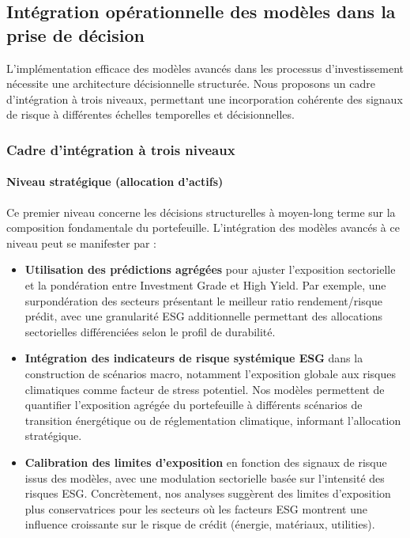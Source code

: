 \subsection{Intégration opérationnelle des modèles dans la prise de décision}

L'implémentation efficace des modèles avancés dans les processus d'investissement nécessite une architecture décisionnelle structurée. Nous proposons un cadre d'intégration à trois niveaux, permettant une incorporation cohérente des signaux de risque à différentes échelles temporelles et décisionnelles.

\subsubsection{Cadre d'intégration à trois niveaux}

\paragraph{Niveau stratégique (allocation d'actifs)}

Ce premier niveau concerne les décisions structurelles à moyen-long terme sur la composition fondamentale du portefeuille. L'intégration des modèles avancés à ce niveau peut se manifester par :

\begin{itemize}
    \item \textbf{Utilisation des prédictions agrégées} pour ajuster l'exposition sectorielle et la pondération entre Investment Grade et High Yield. Par exemple, une surpondération des secteurs présentant le meilleur ratio rendement/risque prédit, avec une granularité ESG additionnelle permettant des allocations sectorielles différenciées selon le profil de durabilité.
    
    \item \textbf{Intégration des indicateurs de risque systémique ESG} dans la construction de scénarios macro, notamment l'exposition globale aux risques climatiques comme facteur de stress potentiel. Nos modèles permettent de quantifier l'exposition agrégée du portefeuille à différents scénarios de transition énergétique ou de réglementation climatique, informant l'allocation stratégique.
    
    \item \textbf{Calibration des limites d'exposition} en fonction des signaux de risque issus des modèles, avec une modulation sectorielle basée sur l'intensité des risques ESG. Concrètement, nos analyses suggèrent des limites d'exposition plus conservatrices pour les secteurs où les facteurs ESG montrent une influence croissante sur le risque de crédit (énergie, matériaux, utilities).
\end{itemize}

